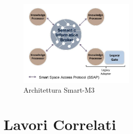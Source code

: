 \begin{figure}[H]
	\centering
	\includegraphics[width=0.5\textwidth]{assets/smart-m3.jpg}
	\caption{Architettura Smart-M3}
	\label{fig:smart-m3}
\end{figure}

\section{Lavori Correlati}

